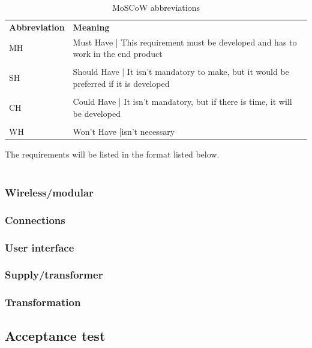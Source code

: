 \begin{table}[H]
\centering
    \begin{tabular}{l p{8cm}}
        \textbf{Abbreviation} & \textbf{Meaning} \\
        MH & Must Have | This requirement must be developed and has to work in the end product\\
        & \\
        SH & Should Have | It isn't mandatory to make, but it would be preferred if it is developed\\
        & \\
        CH & Could Have | It isn't mandatory, but if there is time, it will be developed\\
        & \\
        WH & Won't Have |isn't necessary\\
    \end{tabular}
    \caption{MoSCoW abbreviations}
    \label{tab:moscow_abbreviations}
\end{table}

The requirements will be listed in the format listed below.\\

\\


\subsubsection{Wireless/modular}


\subsubsection{Connections}


\subsubsection{User interface}


\subsubsection{Supply/transformer}


\subsubsection{Transformation}




\subsection{Acceptance test}


